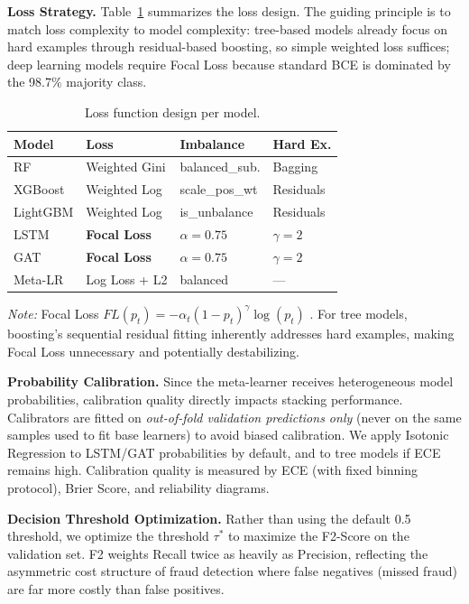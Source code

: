 \documentclass[10pt,a4paper,twocolumn]{article}
\begin{document}
\textbf{Loss Strategy.} Table~\ref{tab:loss} summarizes the loss design. The guiding principle is to match loss complexity to model complexity: tree-based models already focus on hard examples through residual-based boosting, so simple weighted loss suffices; deep learning models require Focal Loss because standard BCE is dominated by the 98.7\% majority class.

\begin{table}[H]
\centering
\caption{Loss function design per model.}
\label{tab:loss}
{\small
\begin{tabularx}{\columnwidth}{@{}lXll@{}}
\toprule
\textbf{Model} & \textbf{Loss} & \textbf{Imbalance} & \textbf{Hard Ex.} \\
\midrule
RF & Weighted Gini & balanced\_sub. & Bagging \\
XGBoost & Weighted Log & scale\_pos\_wt & Residuals \\
LightGBM & Weighted Log & is\_unbalance & Residuals \\
LSTM & \textbf{Focal Loss} & $\alpha{=}0.75$ & $\gamma{=}2$ \\
GAT & \textbf{Focal Loss} & $\alpha{=}0.75$ & $\gamma{=}2$ \\
Meta-LR & Log Loss + L2 & balanced & --- \\
\bottomrule
\end{tabularx}
}
\vspace{2pt}
{\scriptsize\textit{Note:} Focal Loss $FL(p_t) = -\alpha_t(1-p_t)^\gamma\log(p_t)$ \cite{lin2017}. For tree models, boosting's sequential residual fitting inherently addresses hard examples, making Focal Loss unnecessary and potentially destabilizing.}
\end{table}

\textbf{Probability Calibration.} Since the meta-learner receives heterogeneous model probabilities, calibration quality directly impacts stacking performance. Calibrators are fitted on \emph{out-of-fold validation predictions only} (never on the same samples used to fit base learners) to avoid biased calibration. We apply Isotonic Regression to LSTM/GAT probabilities by default, and to tree models if ECE remains high. Calibration quality is measured by ECE (with fixed binning protocol), Brier Score, and reliability diagrams.

\textbf{Decision Threshold Optimization.} Rather than using the default 0.5 threshold, we optimize the threshold $\tau^*$ to maximize the F2-Score on the validation set. F2 weights Recall twice as heavily as Precision, reflecting the asymmetric cost structure of fraud detection where false negatives (missed fraud) are far more costly than false positives.
\end{document}
